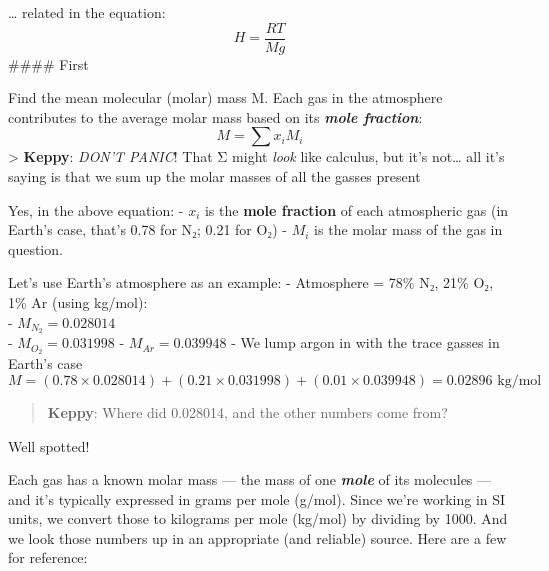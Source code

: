 \documentclass[
  letterpaper,
]{book}
\begin{document}
\ldots{} related in the equation: \[
H = \dfrac{R T}{M g}
\] \#\#\#\# First

Find the mean molecular (molar) mass M. Each gas in the atmosphere
contributes to the average molar mass based on its \textbf{\emph{mole
fraction}}: \[
M = \sum{x_i M_i}
\] \textgreater{} \textbf{Keppy}: \emph{DON'T PANIC}! That Σ might
\emph{look} like calculus, but it's not\ldots{} all it's saying is that
we sum up the molar masses of all the gasses present

Yes, in the above equation: - \(x_i\) is the \textbf{mole fraction} of
each atmospheric gas (in Earth's case, that's 0.78 for N₂; 0.21 for O₂)
- \(M_i\) is the molar mass of the gas in question.

Let's use Earth's atmosphere as an example: - Atmosphere = 78\% N₂, 21\%
O₂, 1\% Ar (using kg/mol):\\
- \(M_{N_2} = 0.028014\)\\
- \(M_{O_2} = 0.031998\) - \(M_{Ar} = 0.039948\) - We lump argon in with
the trace gasses in Earth's case \[
M = (0.78 \times 0.028014) + (0.21 \times 0.031998) + (0.01 \times 0.039948) = 0.02896 \text{ kg/mol}​
\]

\begin{quote}
\textbf{Keppy}: Where did 0.028014, and the other numbers come from?
\end{quote}

Well spotted!

Each gas has a known molar mass --- the mass of one \textbf{\emph{mole}}
of its molecules --- and it's typically expressed in grams per mole
(g/mol). Since we're working in SI units, we convert those to kilograms
per mole (kg/mol) by dividing by 1000. And we look those numbers up in
an appropriate (and reliable) source. Here are a few for reference:
\end{document}
